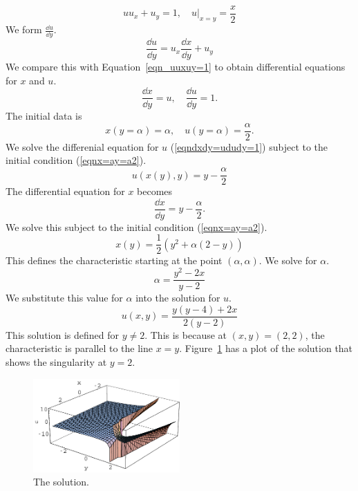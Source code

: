 {%
\begin{Solution}
  \begin{equation}
    \label{eqn_uuxuy=1}
    u u_x + u_y = 1, \quad u \big|_{x=y} = \frac{x}{2}
  \end{equation}
  We form $\frac{\dd u}{\dd y}$.
  \[
  \frac{\dd u}{\dd y} = u_x \frac{\dd x}{\dd y} + u_y
  \]
  We compare this with Equation~\ref{eqn_uuxuy=1} to obtain differential 
  equations for $x$ and $u$.
  \begin{equation}
    \label{eqndxdy=ududy=1}
    \frac{\dd x}{\dd y} = u, \quad \frac{\dd u}{\dd y} = 1.
  \end{equation}
  The initial data is
  \begin{equation}
    \label{eqnx=ay=a2}
    x(y = \alpha) = \alpha, \quad u(y = \alpha) = \frac{\alpha}{2}.
  \end{equation}
  We solve the differenial equation for $u$ (\ref{eqndxdy=ududy=1}) subject to 
  the initial condition (\ref{eqnx=ay=a2}).
  \[
  u(x(y), y) = y - \frac{\alpha}{2}
  \]
  The differential equation for $x$ becomes
  \[
  \frac{\dd x}{\dd y} = y - \frac{\alpha}{2}.
  \]
  We solve this subject to the initial condition (\ref{eqnx=ay=a2}).
  \[
  x(y) = \frac{1}{2} ( y^2 + \alpha (2 - y) )
  \]
  This defines the characteristic starting at the point $(\alpha,\alpha)$.
  We solve for $\alpha$.
  \[
  \alpha = \frac{ y^2 - 2x }{ y - 2 }
  \]
  We substitute this value for $\alpha$ into the solution for $u$.
  \[
  u(x, y) = \frac{ y (y - 4) + 2 x}{ 2 (y - 2) }
  \]
  This solution is defined for $y \neq 2$. This is because at $(x,y) = (2,2)$,
  the characteristic is parallel to the line $x = y$.
  Figure~\ref{u_sing_y_2}
  has a plot of the solution that shows the singularity at $y = 2$.
  \begin{figure}[h!]
    \begin{center}
      \includegraphics[width=0.5\textwidth]{pde/characteristics/u_sing_y_2}
    \end{center}
    \caption{The solution.}
    \label{u_sing_y_2}
  \end{figure}
\end{Solution}








}
